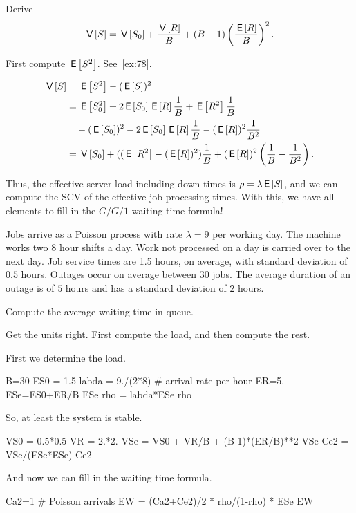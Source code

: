 \begin{exercise}
Derive 
\begin{equation}\label{eq:89} 
 \,\mathsf{V}\left[S\right] = \,\mathsf{V}\left[S_0\right] + \frac{\,\mathsf{V}\left[R\right]} B + (B-1)\left(\frac{\,\mathsf{E}\left[R\right]}{B}\right)^2.
\end{equation}
\begin{hint}
 First compute $\,\mathsf{E}\left[S^2\right]$. See~\cref{ex:78}.
\end{hint}
\begin{solution}
 \begin{equation*}
 \begin{split}
\,\mathsf{V}\left[S\right] 
&=\,\mathsf{E}\left[S^2\right] - (\,\mathsf{E}\left[S\right])^2 \\
&= \,\mathsf{E}\left[S_0^2\right] + 2 \,\mathsf{E}\left[S_0\right] \,\mathsf{E}\left[R\right]\frac 1B + \,\mathsf{E}\left[R^2\right]\frac 1B \\
&\quad - (\,\mathsf{E}\left[S_0\right])^2 - 2\,\mathsf{E}\left[S_0\right]\,\mathsf{E}\left[R\right] \frac 1 B - (\,\mathsf{E}\left[R\right])^2\frac1{B^2}\\
&= \,\mathsf{V}\left[S_0\right] + ((\,\mathsf{E}\left[R^2\right] - (\,\mathsf{E}\left[R\right])^2)\frac 1 B + (\,\mathsf{E}\left[R\right])^2\left(\frac 1B - \frac 1{B^2}\right).
 \end{split}
 \end{equation*}
\end{solution}
\end{exercise}


Thus, the effective server load including down-times is $\rho = \lambda \,\mathsf{E}\left[S\right]$, and we can compute the SCV of the effective job processing times.
With this, we have all elements to fill in the $G/G/1$ waiting time formula!


\begin{exercise}
 Jobs arrive as a Poisson process with rate $\lambda=9$ per working day.
 The machine works two $8$ hour shifts a day.
 Work not processed on a day is carried over to the next day.
 Job service times are 1.5 hours, on average, with standard deviation of $0.5$ hours.
 Outages occur on average between $30$ jobs.
The average duration of an outage  is of $5$ hours and has a standard deviation of $2$ hours.

 Compute the average waiting time in queue.
\begin{hint}
 Get the units right. First compute the load, and then compute the rest.
\end{hint}
\begin{solution}
 First we determine the load. 
 \begin{pyconsole}
B=30
ES0 = 1.5
labda = 9./(2*8) # arrival rate per hour
ER=5.
ESe=ES0+ER/B
ESe
rho = labda*ESe
rho
 \end{pyconsole}
So, at least the system is stable.

\begin{pyconsole}
VS0 = 0.5*0.5
VR = 2.*2.
VSe = VS0 + VR/B + (B-1)*(ER/B)**2
VSe
Ce2 = VSe/(ESe*ESe)
Ce2
\end{pyconsole}

And now we can fill in the waiting time formula.
\begin{pyconsole}
Ca2=1 # Poisson arrivals
EW = (Ca2+Ce2)/2 * rho/(1-rho) * ESe
EW 
\end{pyconsole}
\end{solution}
\end{exercise}




